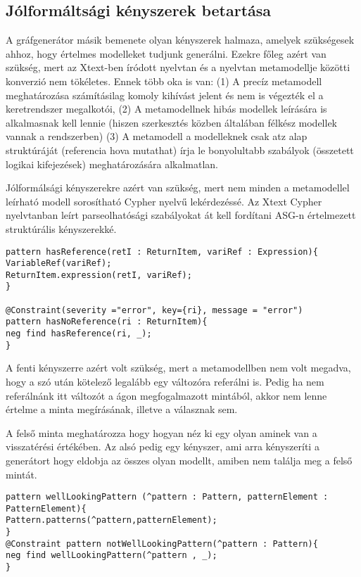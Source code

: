 \subsection{Jólformáltsági kényszerek betartása}
A gráfgenerátor másik bemenete olyan kényszerek halmaza, amelyek szükségesek ahhoz, hogy értelmes modelleket tudjunk generálni. Ezekre főleg azért van szükség, mert az Xtext-ben \cite{xText} íródott nyelvtan és a nyelvtan metamodellje közötti konverzió nem tökéletes. Ennek több oka is van: (1) A precíz metamodell meghatározása számításilag komoly kihívást jelent és nem is végezték el a keretrendszer megalkotói, (2) A metamodellnek hibás modellek leírására is alkalmasnak kell lennie (hiszen szerkesztés közben általában félkész modellek vannak a rendszerben) (3) A metamodell a modelleknek csak atz alap struktúráját (referencia hova mutathat) írja le bonyolultabb szabályok (összetett logikai kifejezések) meghatározására alkalmatlan.

Jólformálsági kényszerekre azért van szükség, mert nem minden a metamodellel leírható modell sorosítható Cypher nyelvű lekérdezéssé. Az Xtext Cypher nyelvtanban leírt parseolhatósági szabályokat át kell fordítani ASG-n értelmezett struktúrális kényszerekké. 




\begin{lstlisting}[style=viatrasmall]
pattern hasReference(retI : ReturnItem, variRef : Expression){
VariableRef(variRef);
ReturnItem.expression(retI, variRef);
}

@Constraint(severity ="error", key={ri}, message = "error")
pattern hasNoReference(ri : ReturnItem){
neg find hasReference(ri, _);
}
\end{lstlisting}

A fenti kényszerre azért volt szükség, mert a metamodellben nem volt megadva, hogy a  szó után kötelező legalább egy változóra referálni is. Pedig ha nem referálnánk itt változót a  ágon megfogalmazott mintából, akkor nem lenne értelme a minta megírásának, illetve a válasznak sem.

A felső minta meghatározza hogy hogyan néz ki egy olyan  aminek van  a visszatérési értékében. Az alsó pedig egy kényszer, ami arra kényszeríti a generátort hogy eldobja az összes olyan modellt, amiben nem találja meg a felső mintát.

\begin{lstlisting}[style=viatrasmall]
pattern wellLookingPattern (^pattern : Pattern, patternElement : PatternElement){
Pattern.patterns(^pattern,patternElement);
}
@Constraint pattern notWellLookingPattern(^pattern : Pattern){
neg find wellLookingPattern(^pattern , _);
}
\end{lstlisting}

